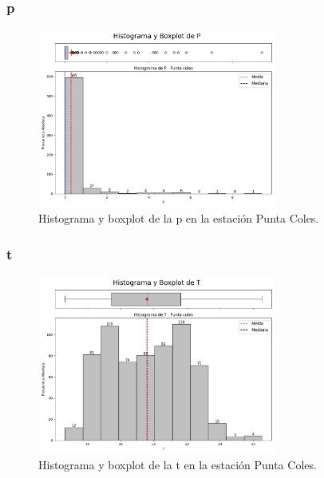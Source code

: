 \subsubsection*{\gls{p} }
\begin{figure}[htbp]
\centering
\includegraphics[width=0.7\textwidth]{resultados/por_estacion_meteorologica/Punta_Coles/P_histograma.png}
\caption{Histograma y boxplot de la \gls{p}  en la estación Punta Coles.}
\label{fig:punta_coles_P}
\end{figure}

\subsubsection*{\gls{t} }
\begin{figure}[htbp]
\centering
\includegraphics[width=0.7\textwidth]{resultados/por_estacion_meteorologica/Punta_Coles/T_histograma.png}
\caption{Histograma y boxplot de la \gls{t}  en la estación Punta Coles.}
\label{fig:punta_coles_T}
\end{figure}

